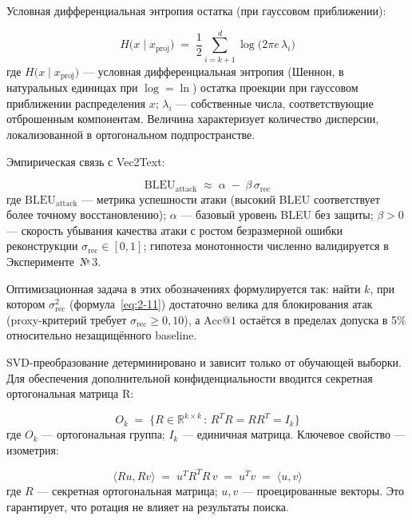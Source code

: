 \documentclass[a4paper, 12pt, oneside, openany]{article}
\begin{document}
Условная дифференциальная энтропия остатка (при гауссовом приближении):

\begin{equation}
	H\bigl( x \mid x_{\mathrm{proj}} \bigr) \;=\; \frac{1}{2} \sum_{i = k + 1}^{d} \log\bigl( 2 \pi e\, \lambda_{i} \bigr)
	\label{eq:2-12}
\end{equation}
где $H\bigl( x \mid x_{\mathrm{proj}} \bigr)$ --- условная дифференциальная энтропия (Шеннон, в натуральных единицах при $\log = \ln$) остатка проекции при гауссовом приближении распределения $x$; $\lambda_{i}$ --- собственные числа, соответствующие отброшенным компонентам. Величина характеризует количество дисперсии, локализованной в ортогональном подпространстве.

Эмпирическая связь с Vec2Text:

\begin{equation}
	\mathrm{BLEU}_{\text{attack}} \;\approx\; \alpha \;-\; \beta\, \sigma_{\mathrm{rec}}
	\label{eq:2-13}
\end{equation}
где $\mathrm{BLEU}_{\text{attack}}$ --- метрика успешности атаки (высокий BLEU соответствует более точному восстановлению); $\alpha$ --- базовый уровень BLEU без защиты; $\beta > 0$ --- скорость убывания качества атаки с ростом безразмерной ошибки реконструкции $\sigma_{\mathrm{rec}} \in [0, 1]$; гипотеза монотонности численно валидируется в Эксперименте~№\,3.

Оптимизационная задача в этих обозначениях формулируется так: найти $k$, при котором $\sigma_{\mathrm{rec}}^{2}$ (формула~\eqref{eq:2-11}) достаточно велика для блокирования атак (proxy-критерий требует $\sigma_{\mathrm{rec}} \geq 0{,}10$), а $\mathrm{Acc}@1$ остаётся в пределах допуска в 5\% относительно незащищённого baseline.

SVD-преобразование детерминировано и зависит только от обучающей выборки. Для обеспечения дополнительной конфиденциальности вводится секретная ортогональная матрица R:

\begin{equation}
	O_{k} \;=\; \bigl\{ R \in \mathbb{R}^{k \times k} \,:\, R^{T} R = R R^{T} = I_{k} \bigr\}
	\label{eq:2-14}
\end{equation}
где $O_{k}$ --- ортогональная группа; $I_{k}$ --- единичная матрица. Ключевое свойство --- изометрия:

\begin{equation}
	\langle R u, R v \rangle \;=\; u^{T} R^{T} R\, v \;=\; u^{T} v \;=\; \langle u, v \rangle
	\label{eq:2-15}
\end{equation}
где \(R\) --- секретная ортогональная матрица; \(u,v\) --- проецированные векторы. Это гарантирует, что ротация не влияет на результаты поиска.
\end{document}
